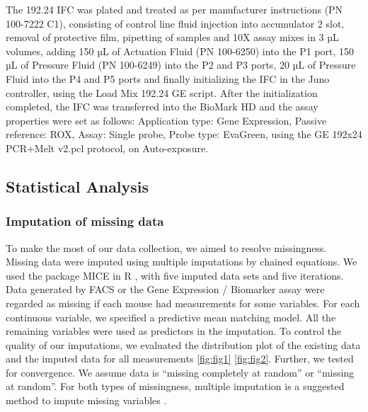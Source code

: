 \documentclass[webpdf,large,contemporary,namedate]{oup-authoring-template}
\theoremstyle{thmstyleone}
\theoremstyle{thmstyletwo}
\theoremstyle{thmstylethree}
\begin{document}
The 192.24 IFC was plated and treated as per manufacturer instructions
(PN 100-7222 C1), consisting of control line fluid injection into
accumulator 2 slot, removal of protective film, pipetting of samples and
10X assay mixes in 3 µL volumes, adding 150 µL of Actuation Fluid (PN
100-6250) into the P1 port, 150 µL of Pressure Fluid (PN 100-6249) into
the P2 and P3 ports, 20 µL of Pressure Fluid into the P4 and P5 ports
and finally initializing the IFC in the Juno controller, using the Load
Mix 192.24 GE script. After the initialization completed, the IFC was
transferred into the BioMark HD and the assay properties were set as
follows: Application type: Gene Expression, Passive reference: ROX,
Assay: Single probe, Probe type: EvaGreen, using the GE 192x24 PCR+Melt
v2.pcl protocol, on Auto-exposure.

\hypertarget{statistical-analysis}{%
\subsection{Statistical Analysis}\label{statistical-analysis}}

\hypertarget{imputation-of-missing-data}{%
\subsubsection{Imputation of missing
data}\label{imputation-of-missing-data}}

To make the most of our data collection, we aimed to resolve
missingness. Missing data were imputed using multiple imputations by
chained equations. We used the package MICE in R \citet{van2011mice},
with five imputed data sets and five iterations. Data generated by FACS
or the Gene Expression / Biomarker assay were regarded as missing if
each mouse had measurements for some variables. For each continuous
variable, we specified a predictive mean matching model. All the
remaining variables were used as predictors in the imputation. To
control the quality of our imputations, we evaluated the distribution
plot of the existing data and the imputed data for all measurements
\ref{fig:fig1} \ref{fig:fig2}. Further, we tested for convergence. We
assume data is ``missing completely at random'' or ``missing at
random''. For both types of missingness, multiple imputation is a
suggested method to impute missing variables \citet{van2018flexible}.
\end{document}
